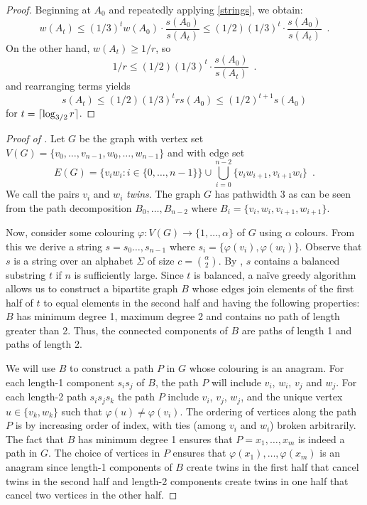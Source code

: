 \documentclass{patmorin}
\begin{document}
\begin{proof}
  Beginning at $A_0$ and repeatedly applying \eqref{strings}, we obtain:
  \[
      w(A_t) \le (1/3)^t w(A_0)\cdot\frac{s(A_0)}{s(A_t)} 
             \le (1/2)(1/3)^t \cdot\frac{s(A_0)}{s(A_t)} \enspace .
  \]
  On the other hand, $w(A_t)\ge 1/r$, so  
  \[ 
      1/r \le (1/2)(1/3)^t\cdot\frac{s(A_0)}{s(A_t)} \enspace .
  \]
  and rearranging terms yields
  \[
     s(A_t) \le (1/2)(1/3)^t r s(A_0) \le (1/2)^{t+1}s(A_0)
  \]
  for $t = {\lceil \log_{3/2} r \rceil}$.
\end{proof}


\begin{proof}[Proof of ]
Let $G$ be the graph with vertex set
$V(G)=\{v_0,\ldots,v_{n-1},w_0,\ldots,w_{n-1}\}$ and with edge set
\[
  E(G) = \{v_iw_i : i\in\{0,\ldots,n-1\}\} \cup \bigcup_{i=0}^{n-2} \{v_iw_{i+1},v_{i+1}w_i\} \enspace .
\]
We call the pairs $v_i$ and $w_i$ \emph{twins}.
The graph $G$ has pathwidth 3 as can be seen from the path decomposition $B_0,\ldots,B_{n-2}$ where $B_i=\{v_i,w_i,v_{i+1},w_{i+1}\}$.

Now, consider some colouring $\varphi:V(G)\to\{1,\ldots,\alpha\}$ of $G$
using $\alpha$ colours. From this we derive a string $s=s_0\ldots,s_{n-1}$
where $s_i=\{\varphi(v_i),\varphi(w_i)\}$.  Observe that $s$ is
a string over an alphabet $\Sigma$ of size $c=\binom{\alpha}{2}$.
By , $s$ contains a balanced substring $t$ if $n$
is sufficiently large.  Since $t$
is balanced, a na\"ive greedy algorithm allows us to construct a bipartite
 graph $B$ whose edges join
elements of the first half of $t$ to equal elements in the second half
and having the following properties: $B$ has minimum degree 1, maximum
degree 2 and contains no path of length greater than 2.  Thus, the
connected components of $B$ are paths of length 1 and paths of length 2.

We will use $B$ to construct a path $P$ in $G$ whose colouring is an
anagram.  For each length-1 component $s_is_j$ of $B$, the path $P$
will include $v_i$, $w_i$, $v_j$ and $w_j$.  For each length-2 path
$s_is_js_k$ the path $P$ include $v_i$, $v_j$, $w_j$, and the unique
vertex $u\in\{v_k,w_k\}$ such that $\varphi(u)\neq \varphi(v_i)$.
The ordering of vertices along the path $P$ is by increasing order
of index, with ties (among $v_i$ and $w_i$) broken arbitrarily.
The fact that $B$ has minimum degree 1 ensures that $P=x_1,\ldots,x_m$
is indeed a path in $G$.  The choice of vertices in $P$ ensures that
$\varphi(x_1),\ldots,\varphi(x_m)$ is an anagram since length-1 components
of $B$ create twins in the first half that cancel twins in the second
half and length-2 components create twins in one half that cancel two
vertices in the other half.
\end{proof}




\end{document}
